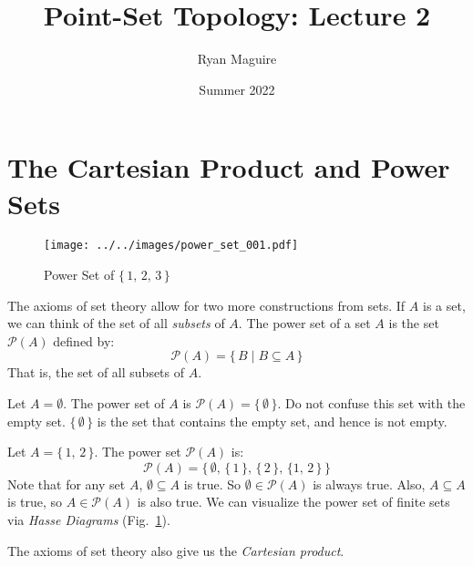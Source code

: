 \documentclass{article}
\title{Point-Set Topology: Lecture 2}
\author{Ryan Maguire}
\date{Summer 2022}
\theoremstyle{plain}
\theoremstyle{normal}
\newenvironment{example}{%
    \pushQED{\qed}\renewcommand{\qedsymbol}{$\blacksquare$}\examplex%
}{%
    \popQED\endexamplex%
}
\newenvironment{definition}{%
    \pushQED{\qed}\renewcommand{\qedsymbol}{$\blacksquare$}\definitionx%
}{%
    \popQED\enddefinitionx%
}
\begin{document}
    \maketitle
    \section{The Cartesian Product and Power Sets}
        \begin{figure}
            \centering
            \texttt{[image: ../../images/power\_set\_001.pdf]}
            \caption{Power Set of $\{\,1,\,2,\,3\,\}$}
            \label{fig:power_set_001}
        \end{figure}
        The axioms of set theory allow for two more constructions from sets.
        If $A$ is a set, we can think of the set of all \textit{subsets} of
        $A$.
        \begin{definition}[\textbf{Power Sets}]
            The power set of a set $A$ is the set $\mathcal{P}(A)$ defined by:
            \begin{equation}
                \mathcal{P}(A)=\{\,B\;|\;B\subseteq{A}\,\}
            \end{equation}
            That is, the set of all subsets of $A$.
        \end{definition}
        \begin{example}
            Let $A=\emptyset$. The power set of $A$ is
            $\mathcal{P}(A)=\{\,\emptyset\,\}$. Do not confuse this set with
            the empty set. $\{\,\emptyset\,\}$ is the set that contains the
            empty set, and hence is not empty.
        \end{example}
        \begin{example}
            Let $A=\{\,1,\,2\,\}$. The power set $\mathcal{P}(A)$ is:
            \begin{equation}
                \mathcal{P}(A)=\big\{\,\emptyset,\,\{\,1\,\},\,
                    \{\,2\,\},\,\{1,\,2\,\}\,\big\}
            \end{equation}
        \end{example}
        Note that for any set $A$, $\emptyset\subseteq{A}$ is true. So
        $\emptyset\in\mathcal{P}(A)$ is always true. Also, $A\subseteq{A}$
        is true, so $A\in\mathcal{P}(A)$ is also true. We can visualize the
        power set of finite sets via \textit{Hasse Diagrams}
        (Fig.~\ref{fig:power_set_001}).
        \par\hfill\par
        The axioms of set theory also give us the \textit{Cartesian product}.
\end{document}
